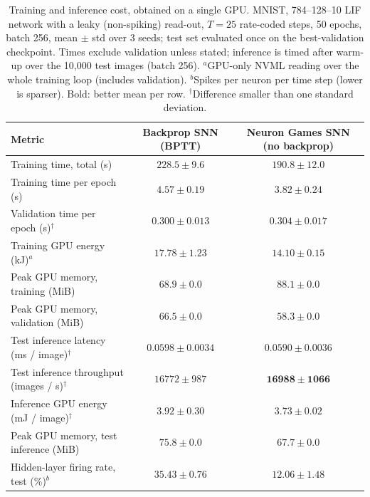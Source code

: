 \documentclass{article}
\begin{document}
\begin{table}[H]
\centering
\small
\caption{Training and inference cost, obtained on a single GPU. MNIST, 784--128--10 LIF network with a leaky (non-spiking) read-out, $T=25$ rate-coded steps, 50 epochs, batch 256, mean $\pm$ std over 3 seeds; test set evaluated once on the best-validation checkpoint. Times exclude validation unless stated; inference is timed after warm-up over the 10{,}000 test images (batch 256). $^a$GPU-only NVML reading over the whole training loop (includes validation). $^b$Spikes per neuron per time step (lower is sparser). Bold: better mean per row. $^\dagger$Difference smaller than one standard deviation.}
\label{tab:t1-cost}
\begin{tabular}{lcc}
\toprule
Metric & Backprop SNN (BPTT) & Neuron Games SNN (no backprop) \\
\midrule
Training time, total (s) & $228.5 \pm 9.6$ & $\boldsymbol{190.8 \pm 12.0}$ \\
Training time per epoch (s) & $4.57 \pm 0.19$ & $\boldsymbol{3.82 \pm 0.24}$ \\
Validation time per epoch (s)$^\dagger$ & $\boldsymbol{0.300 \pm 0.013}$ & $0.304 \pm 0.017$ \\
Training GPU energy (kJ)$^a$ & $17.78 \pm 1.23$ & $\boldsymbol{14.10 \pm 0.15}$ \\
Peak GPU memory, training (MiB) & $\boldsymbol{68.9 \pm 0.0}$ & $88.1 \pm 0.0$ \\
Peak GPU memory, validation (MiB) & $66.5 \pm 0.0$ & $\boldsymbol{58.3 \pm 0.0}$ \\
\midrule
Test inference latency (ms / image)$^\dagger$ & $0.0598 \pm 0.0034$ & $\boldsymbol{0.0590 \pm 0.0036}$ \\
Test inference throughput (images / s)$^\dagger$ & $16772 \pm 987$ & $\boldsymbol{16988 \pm 1066}$ \\
Inference GPU energy (mJ / image)$^\dagger$ & $3.92 \pm 0.30$ & $\boldsymbol{3.73 \pm 0.02}$ \\
Peak GPU memory, test inference (MiB) & $75.8 \pm 0.0$ & $\boldsymbol{67.7 \pm 0.0}$ \\
\midrule
Hidden-layer firing rate, test (\%)$^b$ & $35.43 \pm 0.76$ & $\boldsymbol{12.06 \pm 1.48}$ \\
\bottomrule
\end{tabular}
\end{table}
\end{document}
